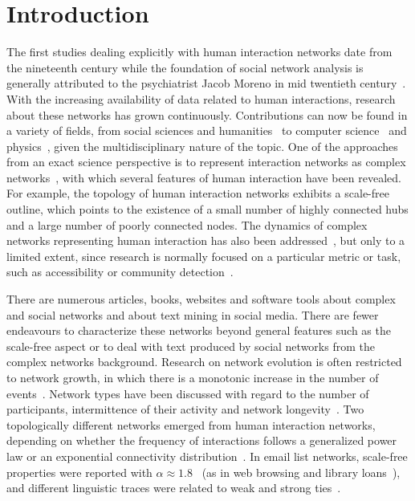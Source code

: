 \chapter{Introduction}\label{ch:int}
The first studies dealing explicitly with human interaction networks
date from the nineteenth century while the foundation of
social network analysis is generally attributed to the psychiatrist Jacob Moreno in mid twentieth century~\cite{moreno,newmanBook}.
With the increasing availability of data related to human interactions, research about these networks has grown continuously.
Contributions can now be found in a variety of fields, from social sciences and humanities~\cite{latour2013} to computer science~\cite{bird} and physics~\cite{barabasiHumanDyn,newmanFriendship}, given the multidisciplinary nature of the topic.
One of the approaches from an exact science perspective is to represent interaction networks as complex networks~\cite{barabasiHumanDyn,newmanFriendship}, with which 
several features of human interaction have been revealed.
For example, the topology of human interaction networks exhibits a scale-free outline,
which points to the existence of a small number of highly connected hubs and a large number of poorly connected nodes.
The dynamics of complex networks representing human interaction has also been addressed~\cite{barabasiEvo,newmanEvolving}, but only to a limited extent, since research is normally focused on a particular metric or task, such as accessibility or community detection~\cite{access,newmanModularity}. 





There are numerous articles, books, websites and software tools about complex and social networks and about text mining in social media.
There are fewer endeavours to characterize these networks beyond general features such as the scale-free 
aspect or to deal with text produced by social networks from the complex networks background.
Research on network evolution is often restricted to network growth, in which there is a monotonic increase in the number of events~\cite{barabasiEvo}.
Network types have been discussed with regard to the number of participants, intermittence of their activity and network longevity~\cite{barabasiEvo}. Two topologically different networks emerged from human interaction networks, depending on whether the frequency of interactions follows a generalized power law or an exponential connectivity distribution~\cite{barabasiTopologicalEv}. In email list networks, scale-free properties were reported with $\alpha \approx 1.8$~\cite{bird} (as in web browsing and library loans~\cite{barabasiHumanDyn}), and different linguistic traces were related to weak and strong ties~\cite{Gmane2}.

